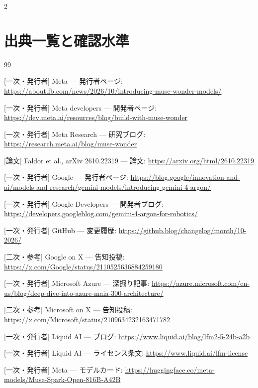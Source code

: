 \documentclass[lualatex,a4paper,10pt]{jlreq}
\begin{document}
\clearpage
\begin{multicols}{2}  %
\section*{出典一覧と確認水準}

\begin{thebibliography}{99}

 [一次・発行者] Meta — 発行者ページ: \url{https://about.fb.com/news/2026/10/introducing-muse-wonder-models/}

 [一次・発行者] Meta developers — 開発者ページ: \url{https://dev.meta.ai/resources/blog/build-with-muse-wonder}

 [一次・発行者] Meta Research — 研究ブログ: \url{https://research.meta.ai/blog/muse-wonder}

 [論文] Faldor et al., arXiv 2610.22319 — 論文: \url{https://arxiv.org/html/2610.22319}

 [一次・発行者] Google — 発行者ページ: \url{https://blog.google/innovation-and-ai/models-and-research/gemini-models/introducing-gemini-4-argon/}

 [一次・発行者] Google Developers — 開発者ブログ: \url{https://developers.googleblog.com/gemini-4-argon-for-robotics/}

 [一次・発行者] GitHub — 変更履歴: \url{https://github.blog/changelog/month/10-2026/}

 [二次・参考] Google on X — 告知投稿: \url{https://x.com/Google/status/2110525636884259180}

 [一次・発行者] Microsoft Azure — 深掘り記事: \url{https://azure.microsoft.com/en-us/blog/deep-dive-into-azure-maia-300-architecture/}

 [二次・参考] Microsoft on X — 告知投稿: \url{https://x.com/Microsoft/status/2109634232163471782}

 [一次・発行者] Liquid AI — ブログ: \url{https://www.liquid.ai/blog/lfm2-5-24b-a2b}

 [一次・発行者] Liquid AI — ライセンス条文: \url{https://www.liquid.ai/lfm-license}

 [一次・発行者] Meta — モデルカード: \url{https://huggingface.co/meta-models/Muse-Spark-Open-816B-A42B}


\end{thebibliography}
\end{multicols}
\end{document}
